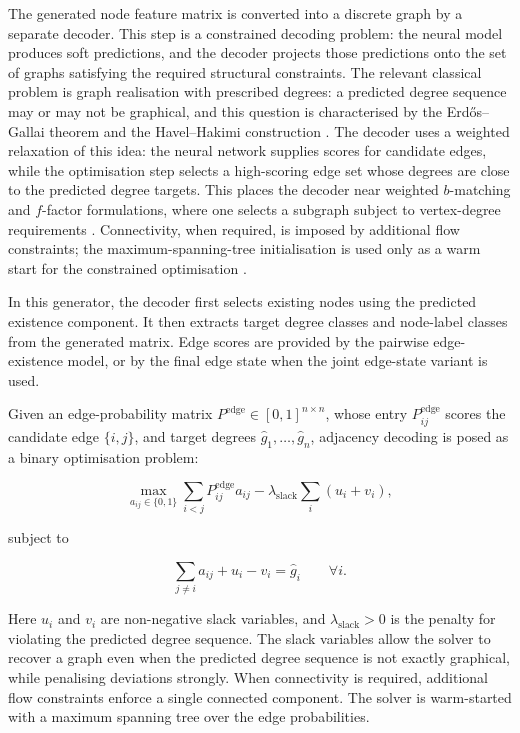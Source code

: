The generated node feature matrix is converted into a discrete graph by a
separate decoder. This step is a constrained decoding problem: the neural model
produces soft predictions, and the decoder projects those predictions onto the
set of graphs satisfying the required structural constraints. The relevant
classical problem is graph realisation with prescribed degrees: a predicted
degree sequence may or may not be graphical, and this question is characterised
by the Erdős--Gallai theorem and the Havel--Hakimi construction
\citep{havel1955remark,erdos1960graphs,hakimi1962realizability}. The decoder
uses a weighted relaxation of this idea: the neural network supplies scores for
candidate edges, while the optimisation step selects a high-scoring edge set
whose degrees are close to the predicted degree targets. This places the
decoder near weighted \(b\)-matching and \(f\)-factor formulations, where one
selects a subgraph subject to vertex-degree requirements
\citep{tutte1954short,edmonds1965paths,gabow2016data}. Connectivity, when
required, is imposed by additional flow constraints; the maximum-spanning-tree
initialisation is used only as a warm start for the constrained optimisation
\citep{kruskal1956shortest,ahuja1993network}.

In this generator, the decoder first selects existing nodes using the predicted
existence component. It then extracts target degree classes and node-label
classes from the generated matrix. Edge scores are provided by the pairwise
edge-existence model, or by the final edge state when the joint edge-state
variant is used.

Given an edge-probability matrix
\(P^{\mathrm{edge}}\in[0,1]^{n\times n}\), whose entry
\(P^{\mathrm{edge}}_{ij}\) scores the candidate edge \(\{i,j\}\), and target
degrees \(\hat{g}_1,\ldots,\hat{g}_n\), adjacency decoding is posed as a binary
optimisation problem:

\[
    \max_{a_{ij}\in\{0,1\}}
    \sum_{i<j} P^{\mathrm{edge}}_{ij} a_{ij}
    -
    \lambda_{\mathrm{slack}}
    \sum_i (u_i+v_i),
\]

subject to

\[
    \sum_{j\ne i} a_{ij} + u_i - v_i = \hat{g}_i
    \qquad
    \forall i.
\]

Here \(u_i\) and \(v_i\) are non-negative slack variables, and
\(\lambda_{\mathrm{slack}}>0\) is the penalty for violating the predicted degree
sequence. The slack variables allow the solver to recover a graph even when the
predicted degree sequence is not exactly graphical, while penalising deviations
strongly. When connectivity is required, additional flow constraints enforce a
single connected component. The solver is warm-started with a maximum spanning
tree over the edge probabilities.

